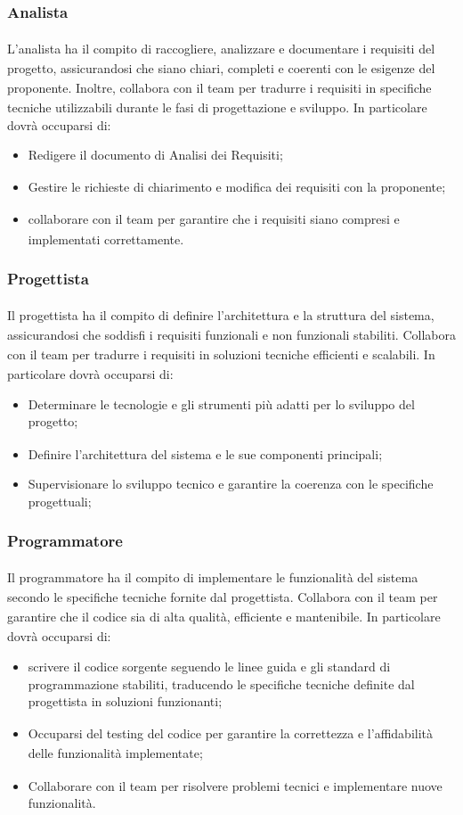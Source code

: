 \documentclass[a4paper,11pt]{article}
\newcommand{\G}{\textsubscript{\scalebox{0.6}{\textbf{G}}}}
\begin{document}
\subsubsection{Analista\G{}}
L'analista\G{} ha il compito di raccogliere, analizzare e documentare i requisiti\G{} del 
progetto\G{}, assicurandosi che siano chiari, completi e coerenti con le esigenze del 
proponente\G{}. Inoltre, collabora con il team per tradurre i requisiti\G{} in specifiche tecniche 
utilizzabili durante le fasi di progettazione e sviluppo.
In particolare dovrà occuparsi di:
\begin{itemize}
    \item Redigere il documento di Analisi dei Requisiti\G{};
    \item Gestire le richieste di chiarimento e modifica dei requisiti\G{} con la proponente\G{};
    \item collaborare con il team per garantire che i requisiti\G{} siano compresi e implementati correttamente.
\end{itemize}

\subsubsection{Progettista\G{}}
Il progettista\G{} ha il compito di definire l'architettura e la struttura del sistema, 
assicurandosi che soddisfi i requisiti\G{} funzionali\G{} e non funzionali\G{} stabiliti. Collabora con il team per tradurre i requisiti\G{} in soluzioni tecniche 
efficienti e scalabili.
In particolare dovrà occuparsi di:
\begin{itemize}
    \item Determinare le tecnologie e gli strumenti più adatti per lo sviluppo del progetto\G{};
    \item Definire l'architettura del sistema e le sue componenti principali;
    \item Supervisionare lo sviluppo tecnico e garantire la coerenza con le specifiche progettuali;
\end{itemize}

\subsubsection{Programmatore\G{}}
Il programmatore\G{} ha il compito di implementare le funzionalità\G{} del sistema
secondo le specifiche tecniche fornite dal progettista\G{}. Collabora con il team per
garantire che il codice sia di alta qualità\G{}, efficiente e mantenibile.
In particolare dovrà occuparsi di:
\begin{itemize}
    \item scrivere il codice sorgente seguendo le linee guida e gli standard di
    programmazione stabiliti, traducendo le specifiche tecniche definite dal progettista\G{} in soluzioni funzionanti;
    \item Occuparsi del testing del codice per garantire la correttezza e 
    l'affidabilità\G{} delle funzionalità\G{} implementate;
    \item Collaborare con il team per risolvere problemi tecnici e implementare
    nuove funzionalità\G{}.
\end{itemize}
\end{document}

